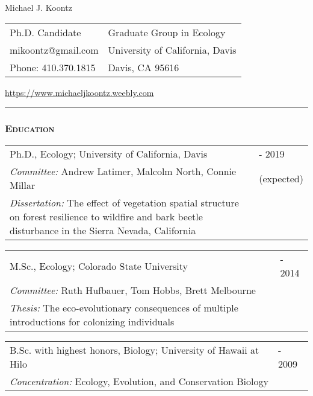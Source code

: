 \documentclass[10pt,english]{article}
\providecommand{\tabularnewline}{\\}
\begin{document}
\begin {center}
{\huge Michael J. Koontz}\tabularnewline
\vspace{1em}

\begin{tabularx}{\textwidth}{@{}>{\raggedright}X >{\raggedleft}X@{}}
Ph.D. Candidate & Graduate Group in Ecology \tabularnewline
mikoontz@gmail.com & University of California, Davis \tabularnewline
Phone: 410.370.1815 & Davis, CA 95616 
\end{tabularx}

\url{https://www.michaeljkoontz.weebly.com}
\end{center}
\vspace{-1.5em}

\rule[0.5ex]{1\linewidth}{0.5pt} 


\vspace{0.5ex}
\subsubsection*{\textsc{Education}}
\vspace{-0.5ex}

\renewcommand{\arraystretch}{1.2}
\begin{tabularx}{\textwidth}{@{}>{\raggedright}p{5.25in} >{\raggedleft}X@{}}
Ph.D., Ecology; University of California, Davis & 2014 - 2019 \tabularnewline
\addtolength{\leftskip}{5ex}\emph{Committee:} Andrew Latimer, Malcolm North, Connie Millar & (expected)  \tabularnewline
\addtolength{\leftskip}{5ex}\emph{Dissertation:} The effect of vegetation spatial structure on forest resilience to wildfire and bark beetle disturbance in the Sierra Nevada, California & \tabularnewline
\end{tabularx}

\begin{tabularx}{\textwidth}{@{}>{\raggedright}p{5.25in} >{\raggedleft}X@{}}
M.Sc., Ecology; Colorado State University & 2012 - 2014 \tabularnewline
\addtolength{\leftskip}{5ex}\emph{Committee:} Ruth Hufbauer, Tom Hobbs, Brett Melbourne & \tabularnewline
\addtolength{\leftskip}{5ex}\emph{Thesis:} The eco-evolutionary consequences of multiple introductions for colonizing individuals & \tabularnewline
\end{tabularx}

\begin{tabularx}{\textwidth}{@{}>{\raggedright}p{5.25in} >{\raggedleft}X@{}}
B.Sc. with highest honors, Biology; University of Hawaii at Hilo & 2007 - 2009 \tabularnewline
\addtolength{\leftskip}{5ex}\emph{Concentration:} Ecology, Evolution, and Conservation Biology
\end{tabularx}
\end{document}
